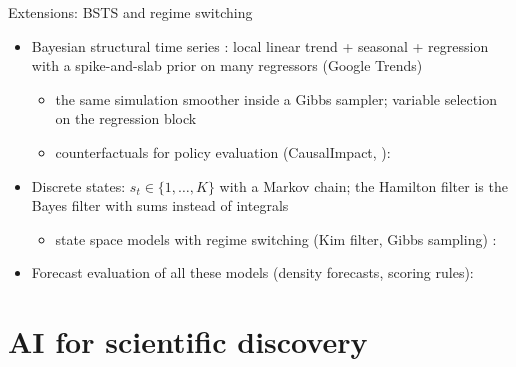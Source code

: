 \begin{frame}{Extensions: BSTS and regime switching}
\itemsize{\small}
\begin{itemize}
    \item Bayesian structural time series : local linear trend + seasonal + regression with a spike-and-slab prior on many regressors (Google Trends)
    \begin{itemize}
        \item the same simulation smoother inside a Gibbs sampler; variable selection on the regression block
        \item counterfactuals for policy evaluation (CausalImpact, ): 
    \end{itemize}
    \item Discrete states: $s_t \in \{1, \dots, K\}$ with a Markov chain; the Hamilton filter is the Bayes filter with sums instead of integrals
    \begin{itemize}
        \item state space models with regime switching (Kim filter, Gibbs sampling) : 
    \end{itemize}
    \item Forecast evaluation of all these models (density forecasts, scoring rules): 
\end{itemize}
\end{frame}


\section{AI for scientific discovery}

